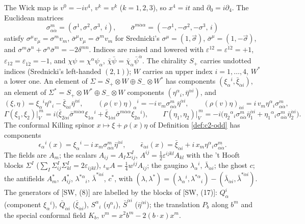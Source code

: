 \begin{definition}
\label{def:c8-twocomp}
The Wick map is $v^0=-iv^4$, $v^k=v^k$ ($k=1,2,3$), so $x^4=it$ and $\partial_0=i\partial_4$. The Euclidean matrices
\[
\sigma^m_{\alpha\dot\alpha}=(\sigma^1,\sigma^2,\sigma^3,\,i),\qquad \bar\sigma^{m\dot\alpha\alpha}=(-\sigma^1,-\sigma^2,-\sigma^3,\,i)
\]
satisfy $\sigma^\mu v_\mu=\sigma^mv_m$, $\bar\sigma^\mu v_\mu=\bar\sigma^mv_m$ for Srednicki's $\sigma^\mu=(1,\vec\sigma)$, $\bar\sigma^\mu=(1,-\vec\sigma)$, and $\sigma^m\bar\sigma^n+\sigma^n\bar\sigma^m=-2\delta^{mn}$. Indices are raised and lowered with $\varepsilon^{12}=\varepsilon^{\dot1\dot2}=+1$, $\varepsilon_{12}=\varepsilon_{\dot1\dot2}=-1$, and $\chi\psi=\chi^\alpha\psi_\alpha$, $\bar\chi\bar\psi=\bar\chi_{\dot\alpha}\bar\psi^{\dot\alpha}$. The chirality $S_+$ carries undotted indices (Srednicki's left-handed $(2,1)$); $W$ carries an upper index $i=1,\dots,4$, $W^*$ a lower one. An element of $\Sigma=S_+\otimes W\oplus S_-\otimes W^*$ has components $(\xi_\alpha{}^i,\bar\xi_{\dot\alpha i})$, an element of $\Sigma^*=S_+\otimes W^*\oplus S_-\otimes W$ components $(\eta^\alpha{}_i,\bar\eta^{\dot\alpha i})$, and
\begin{equation}
(\xi,\eta)=\xi_\alpha{}^i\eta^\alpha{}_i-\bar\xi_{\dot\alpha i}\bar\eta^{\dot\alpha i},\qquad (\rho(v)\eta)_\alpha{}^i=-i\,v_m\sigma^m_{\alpha\dot\alpha}\bar\eta^{\dot\alpha i},\qquad (\rho(v)\eta)_{\dot\alpha i}=i\,v_m\eta^\alpha{}_i\sigma^m_{\alpha\dot\alpha},
\label{eq:c8-pairing}
\end{equation}
\[
\Gamma(\xi_1,\xi_2)\big|_V^{\,m}=i\big(\bar\xi_{2\dot\alpha i}\bar\sigma^{m\dot\alpha\alpha}\xi_{1\alpha}{}^i+\bar\xi_{1\dot\alpha i}\bar\sigma^{m\dot\alpha\alpha}\xi_{2\alpha}{}^i\big),\qquad
\Gamma(\eta_1,\eta_2)\big|_V^{\,m}=-i\big(\eta_2{}^\alpha{}_i\sigma^m_{\alpha\dot\alpha}\bar\eta_1^{\dot\alpha i}+\eta_1{}^\alpha{}_i\sigma^m_{\alpha\dot\alpha}\bar\eta_2^{\dot\alpha i}\big).
\]
The conformal Killing spinor $x\mapsto\xi+\rho(x)\eta$ of Definition \ref{def:c2-odd} has components
\begin{equation}
\epsilon_\alpha{}^i(x)=\xi_\alpha{}^i-i\,x_m\sigma^m_{\alpha\dot\alpha}\bar\eta^{\dot\alpha i},\qquad \bar\epsilon_{\dot\alpha i}(x)=\bar\xi_{\dot\alpha i}+i\,x_m\eta^\alpha{}_i\sigma^m_{\alpha\dot\alpha}.
\label{eq:c8-killing}
\end{equation}
The fields are $A_m$; the scalars $A_{ij}=A_I\Sigma^I_{ij}$, $A^{ij}=\tfrac12\varepsilon^{ijkl}A_{kl}$ with the 't Hooft blocks $\Sigma^I$ ($\sum_I\Sigma^I_{ij}\Sigma^I_{kl}=2\varepsilon_{ijkl}$), $\iota_wA=\tfrac14w^{ij}A_{ij}$; the gaugino $\lambda_\alpha{}^i$, $\bar\lambda_{\dot\alpha i}$; the ghost $c$; the antifields $A^*_m$, $A^*_{ij}$, $\lambda^{*\alpha}{}_i$, $\bar\lambda^{*\dot\alpha i}$, $c^*$, with $(\lambda,\lambda^*)=(\lambda_\alpha{}^i,\lambda^{*\alpha}{}_i)-(\bar\lambda_{\dot\alpha i},\bar\lambda^{*\dot\alpha i})$. The generators of [SW, (8)] are labelled by the blocks of [SW, (17)]: $Q^i_\alpha$ (component $\xi_\alpha{}^i$), $\bar Q_{\dot\alpha i}$ ($\bar\xi_{\dot\alpha i}$), $S^\alpha{}_i$ ($\eta^\alpha{}_i$), $\bar S^{\dot\alpha i}$ ($\bar\eta^{\dot\alpha i}$); the translation $P_b$ along $b^m$ and the special conformal field $K_b$, $v^m=x^2b^m-2(b\cdot x)x^m$.

\end{definition}
